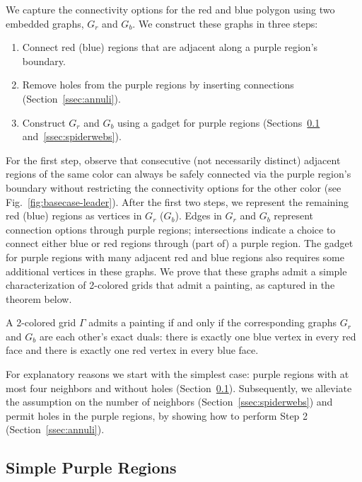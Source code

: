 \documentclass[runningheads]{llncs}
\begin{document}
We capture the connectivity options for the red and blue polygon using two embedded graphs, $G_r$ and $G_b$.
We construct these graphs in three steps:
\begin{enumerate}
\item Connect red (blue) regions that are adjacent along a purple region's boundary.
\item Remove holes from the purple regions by inserting connections (Section~\ref{ssec:annuli}).
\item Construct $G_r$ and $G_b$ using a gadget for purple regions (Sections~\ref{ssec:tograph} and~\ref{ssec:spiderwebs}).
\end{enumerate}
For the first step, observe that consecutive (not necessarily distinct) adjacent regions of the same color can always be safely connected via the purple region's boundary without restricting the connectivity options for the other color (see Fig.~\ref{fig:basecase-leader}).
After the first two steps, we represent the remaining red (blue) regions as vertices in $G_r$ ($G_b$).
Edges in $G_r$ and $G_b$ represent connection options through purple regions; intersections indicate a choice to connect either blue or red regions through (part of) a purple region.
The gadget for purple regions with many adjacent red and blue regions also requires some additional vertices in these graphs.
We prove that these graphs admit a simple characterization of 2-colored grids that admit a painting, as captured in the theorem below.

\begin{theorem}\label{the:dualPaintingFinal}
A 2-colored grid $\Gamma$ admits a painting if and only if the corresponding graphs $G_r$ and $G_b$ are each other's exact duals: there is exactly one blue vertex in every red face and there is exactly one red vertex in every blue face.
\end{theorem}

For explanatory reasons we start with the simplest case: purple regions with at most four neighbors and without holes (Section~\ref{ssec:tograph}).
Subsequently, we alleviate the assumption on the number of neighbors (Section~\ref{ssec:spiderwebs}) and permit holes in the purple regions, by showing how to perform Step 2 (Section~\ref{ssec:annuli}).

\subsection{Simple Purple Regions}
\label{ssec:tograph}
\end{document}
